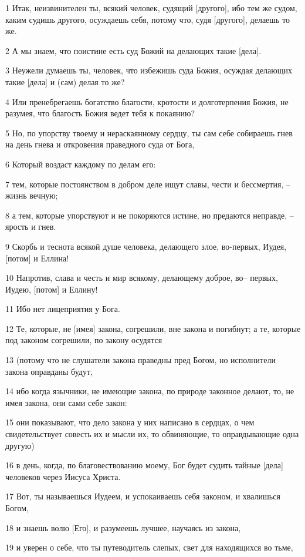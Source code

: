 \par 1 Итак, неизвинителен ты, всякий человек, судящий [другого], ибо тем же судом, каким судишь другого, осуждаешь себя, потому что, судя [другого], делаешь то же.
\par 2 А мы знаем, что поистине есть суд Божий на делающих такие [дела].
\par 3 Неужели думаешь ты, человек, что избежишь суда Божия, осуждая делающих такие [дела] и (сам) делая то же?
\par 4 Или пренебрегаешь богатство благости, кротости и долготерпения Божия, не разумея, что благость Божия ведет тебя к покаянию?
\par 5 Но, по упорству твоему и нераскаянному сердцу, ты сам себе собираешь гнев на день гнева и откровения праведного суда от Бога,
\par 6 Который воздаст каждому по делам его:
\par 7 тем, которые постоянством в добром деле ищут славы, чести и бессмертия, --жизнь вечную;
\par 8 а тем, которые упорствуют и не покоряются истине, но предаются неправде, --ярость и гнев.
\par 9 Скорбь и теснота всякой душе человека, делающего злое, во-первых, Иудея, [потом] и Еллина!
\par 10 Напротив, слава и честь и мир всякому, делающему доброе, во-- первых, Иудею, [потом] и Еллину!
\par 11 Ибо нет лицеприятия у Бога.
\par 12 Те, которые, не [имея] закона, согрешили, вне закона и погибнут; а те, которые под законом согрешили, по закону осудятся
\par 13 (потому что не слушатели закона праведны пред Богом, но исполнители закона оправданы будут,
\par 14 ибо когда язычники, не имеющие закона, по природе законное делают, то, не имея закона, они сами себе закон:
\par 15 они показывают, что дело закона у них написано в сердцах, о чем свидетельствует совесть их и мысли их, то обвиняющие, то оправдывающие одна другую)
\par 16 в день, когда, по благовествованию моему, Бог будет судить тайные [дела] человеков через Иисуса Христа.
\par 17 Вот, ты называешься Иудеем, и успокаиваешь себя законом, и хвалишься Богом,
\par 18 и знаешь волю [Его], и разумеешь лучшее, научаясь из закона,
\par 19 и уверен о себе, что ты путеводитель слепых, свет для находящихся во тьме,
